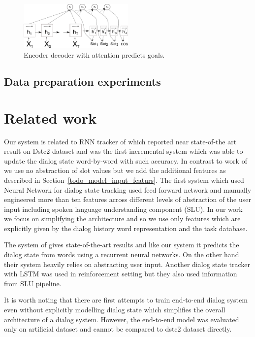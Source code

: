 \documentclass{itatnew}
\begin{document}
\begin{figure}
\includegraphics[width=0.5\textwidth]{encdec}
\caption{Encoder decoder with attention predicts goals.}
\end{figure}

\subsection{Data preparation experiments}

\section{Related work}
Our system is related to RNN tracker of \cite{Zilka} which reported near state-of-the art result on Dstc2 dataset and was the first incremental system which was able to update the dialog state word-by-word with such accuracy.
In contrast to work of \cite{Zilka} we use no abstraction of slot values but we add the additional features as described in Section~\ref{todo_model_input_featurs}.
The first system which used Neural Network for dialog state tracking \cite{henderson} used feed forward network and manually engineered more than ten features across different levels of abstraction of the user input including spoken language understanding component (SLU).
In our work we focus on simplifying the architecture and so we use only features which are explicitly given by the dialog history word representation and the task database.

The system of \cite{Word-based dialog state tracking with recurrent neural networks-Henderson} gives state-of-the-art results and like our system it predicts the dialog state from words using a recurrent neural networks.
On the other hand their system heavily relies on abstracting user input.
Another dialog state tracker with LSTM was used in reinforcement setting but they also used information from SLU pipeline.\cite{Dialog History Construction with Long-Short Term Memory for Robust Generative Dialog State Tracking}

It is worth noting that there are first attempts to train end-to-end dialog system even without explicitly modelling dialog state\cite{Weston} which simplifies the overall architecture of a dialog system.
However, the end-to-end model was evaluated only on artificial dataset and cannot be compared to dstc2 dataset directly.
\end{document}
